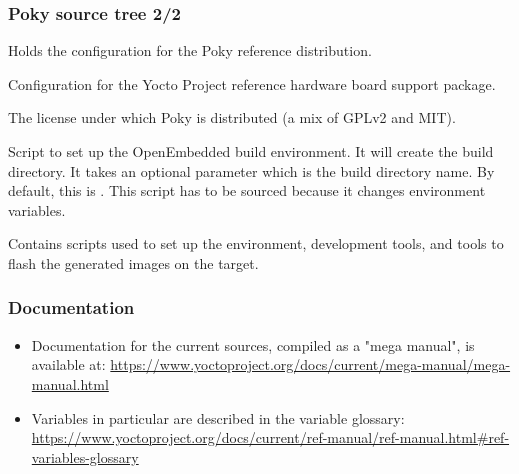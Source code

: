 \begin{frame}
  \frametitle{Poky source tree 2/2}
  \begin{description}[style=nextline]
  \item[meta-poky/] Holds the configuration for the Poky
    reference distribution.
  \item[meta-yocto-bsp/] Configuration for the Yocto Project
    reference hardware board support package.
  \item[LICENSE] The license under which Poky is distributed (a mix of
    GPLv2 and MIT).
  \item[oe-init-build-env] Script to set up the OpenEmbedded build
    environment. It will create the build directory. It takes an optional
    parameter which is the build directory name. By default, this is
    . This script has to be sourced because it changes
    environment variables.
  \item[scripts] Contains scripts used to set up the environment,
    development tools, and tools to flash the generated images on the
    target.
  \end{description}
\end{frame}

\begin{frame}
  \frametitle{Documentation}
  \begin{itemize}
    \item Documentation for the current sources, compiled as a "mega
      manual", is available at:
      \url{https://www.yoctoproject.org/docs/current/mega-manual/mega-manual.html}
    \item Variables in particular are described in the variable
      glossary:
      \url{https://www.yoctoproject.org/docs/current/ref-manual/ref-manual.html\#ref-variables-glossary}
  \end{itemize}
\end{frame}
